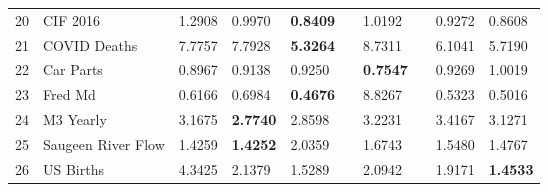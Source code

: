 \begin{tabular}{llllllllll}
20 & CIF 2016 & 1.2908 & 0.9970 & \textbf{0.8409} &  & 1.0192 &  & 0.9272 & 0.8608 \\
21 & COVID Deaths & 7.7757 & 7.7928 & \textbf{5.3264} &  & 8.7311 &  & 6.1041 & 5.7190 \\
22 & Car Parts & 0.8967 & 0.9138 & 0.9250 &  & \textbf{0.7547} &  & 0.9269 & 1.0019 \\
23 & Fred Md & 0.6166 & 0.6984 & \textbf{0.4676} &  & 8.8267 &  & 0.5323 & 0.5016 \\
24 & M3 Yearly & 3.1675 & \textbf{2.7740} & 2.8598 &  & 3.2231 &  & 3.4167 & 3.1271 \\
25 & Saugeen River Flow & 1.4259 & \textbf{1.4252} & 2.0359 &  & 1.6743 &  & 1.5480 & 1.4767 \\
26 & US Births & 4.3425 & 2.1379 & 1.5289 &  & 2.0942 &  & 1.9171 & \textbf{1.4533} \\
\bottomrule
\end{tabular}
